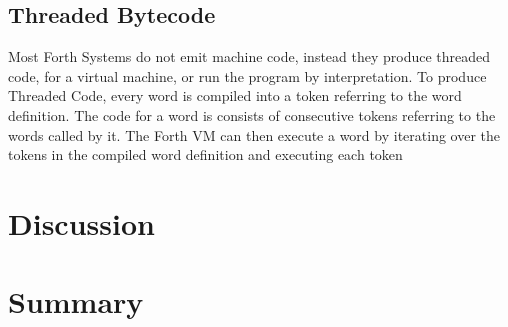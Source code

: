 \documentclass{llncs}
\begin{document}
\subsection{Threaded Bytecode}

Most Forth Systems do not emit machine code, instead they produce threaded code, for a virtual machine, or run the program by interpretation.
To produce Threaded Code, every word is compiled into a token referring to the word definition. The code for a word is consists of consecutive tokens referring to the words called by it. The Forth VM can then execute a word by iterating over the tokens in the compiled word definition and executing each token
 
 \section{Discussion}


 \section{Summary}

{}
\end{document}
